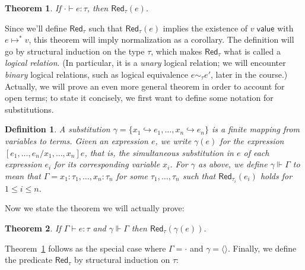 \documentclass{article}
\newcommand{\m}[1]{\mathsf{#1}}
\newcommand{\step}{\mapsto}
\newcommand{\val}[1]{#1 \; \m{value}}
\newcommand{\G}{\Gamma}
\newcommand{\mstep}{\step^{*}}
\newcommand{\Red}{\m{Red}}
\newcommand{\issubst}{\Vdash}
\newtheorem{theorem}{Theorem}
\newtheorem{definition}{Definition}
\begin{document}
\begin{theorem}\label{thm:red}
    If $\cdot \vdash e : \tau$, then $\Red_{\tau}(e)$.
\end{theorem}
Since we'll define $\Red_\tau$ such that $\Red_\tau(e)$ implies the
existence of $\val{v}$ with $e \mstep v$, this theorem will imply
normalization as a corollary. The definition will go by structural
induction on the type $\tau$, which makes $\Red_\tau$ what is called a
\emph{logical relation}. (In particular, it is a \emph{unary} logical
relation; we will encounter \emph{binary} logical relations, such as
logical equivalence $e \sim_\tau e'$, later in the course.)  Actually,
we will prove an even more general theorem in order to account for
open terms; to state it concisely, we first want to define some
notation for substitutions.
\begin{definition}
  A substitution $\gamma = \{x_1 \hookrightarrow
  e_1, \ldots, x_n \hookrightarrow e_n\}$ is a finite mapping from
  variables to terms. Given an expression $e$, we write $\gamma(e)$
  for the expression $[e_1,\ldots,e_n/x_1,\ldots,x_n]e$, that is, the
  simultaneous substitution in $e$ of each expression $e_i$ for its
  corresponding variable $x_i$. For $\gamma$ as above, we define
  $\gamma \issubst \G$ to mean that $\G = x_1 : \tau_1, \ldots, x_n :
  \tau_n$ for some $\tau_1,\ldots,\tau_n$ such that
  $\Red_{\tau_i}(e_i)$ holds for $1 \le i \le n$.
\end{definition}
Now we state the theorem we will actually prove:
\begin{theorem}\label{thm:red_subst}
  If $\G \vdash e : \tau$ and $\gamma \issubst \G$ then $\Red_\tau(\gamma(e))$.
\end{theorem}
Theorem~\ref{thm:red} follows as the special case where $\G = \cdot$ and $\gamma =
\langle \rangle$. Finally, we define the predicate $\Red_\tau$ by
structural induction on $\tau$:
\end{document}
